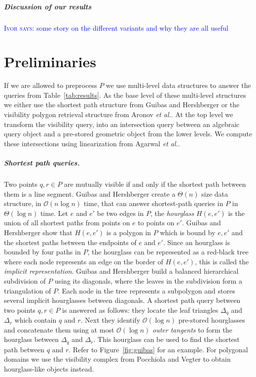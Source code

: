 \documentclass[a4paper, UKenglish]{paper}
\newcommand{\myremark}[4]{\textcolor{blue}{\textsc{#1 #2:}} \textcolor{#4}{\textsf{#3}}}
\newcommand{\ivor}[2][says]{\myremark{Ivor}{#1}{#2}{Blue}}
\newcommand{\etal}{\textit{et al.}\xspace}
\begin{document}
\subparagraph{Discussion of our results}

\ivor{some story on the different variants and why they are all useful}

\section{Preliminaries}
\label{sec:prelims}

If we are allowed to preprocess $P$ we use multi-level data structures to answer the queries from Table~\ref{tab:results}. As the base level of these multi-level structures we either use the shortest path structure from Guibas and Hershberger \cite{guibas1989optimal} or the visibility polygon retrieval structure from Aronov \etal \cite{aronov2002visibility}. At the top level we transform the visibility query, into an intersection query between an algebraic query object and a pre-stored geometric object from the lower levels. We compute these intersections using linearization from Agarwal \etal \cite{agarwal2013range}.


\subparagraph{Shortest path queries.}
Two points $q,r \in P$ are mutually visible if and only if the shortest path between them is a line segment.  Guibas and Hershberger \cite{guibas1989optimal} create a $\Theta(n)$ size data structure, in $\mathcal{O}(n \log n)$ time, that can answer shortest-path queries in $P$ in $\Theta(\log n)$ time. Let $e$ and $e'$ be two edges in $P$, the \emph{hourglass} $H(e, e')$ is the union of all shortest paths from points on $e$ to points on $e'$. Guibas and Hershberger show that $H(e, e')$ is a polygon in $P$ which is bound by $e, e'$ and the shortest paths between the endpoints of $e$ and $e'$. Since an hourglass is bounded by four paths in $P$, the hourglass can be represented as a red-black tree where each node represents an edge on the border of $H(e, e')$, this is called the \emph{implicit representation}. 
Guibas and Hershberger build a balanced hierarchical subdivision of $P$ using its diagonals, where the leaves in the subdivision form a triangulation of $P$. Each node in the tree represents a subpolygon and stores several implicit hourglasses between diagonals. A shortest path query between two points $q,r \in P$ is answered as follows: they locate the leaf triangles $\Delta_q$ and $\Delta_r$ which contain $q$ and $r$. Next they identify  $\mathcal{O}(\log n)$ pre-stored hourglasses and concatenate them using at most $\mathcal{O}(\log n)$ \emph{outer tangents} to form the hourglass between $\Delta_q$ and $\Delta_r$. This hourglass can be used to find the shortest path between $q$ and $r$. Refer to Figure~\ref{fig:guibas} for an example. For polygonal domains we use the visibility complex from Pocchiola and Vegter \cite{pocchiola1996visibility} to obtain hourglass-like objects instead.
\end{document}
